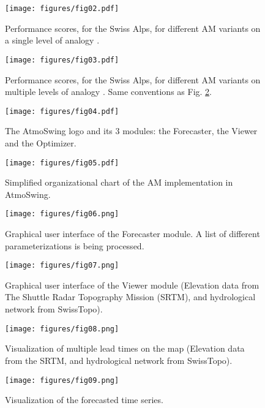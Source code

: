 \documentclass[review]{elsarticle}
\begin{document}
\begin{figure}[t]
	\texttt{[image: figures/fig02.pdf]}
	\caption{Performance scores, for the Swiss Alps, for different AM variants on a single level of analogy \citep{Horton2012a}.}
	\label{figure:scores_1}
\end{figure}

\begin{figure}[t]
	\texttt{[image: figures/fig03.pdf]}
	\caption{Performance scores, for the Swiss Alps, for different AM variants on multiple levels of analogy \citep{Horton2012a}. Same conventions as Fig. \ref{figure:scores_2}.}
	\label{figure:scores_2}
\end{figure}

\begin{figure}[t]
	\texttt{[image: figures/fig04.pdf]}
	\caption{The AtmoSwing logo and its 3 modules: the Forecaster, the Viewer and the Optimizer.}
	\label{figure:logo}
\end{figure}

\begin{figure}[t]
	\texttt{[image: figures/fig05.pdf]}
	\caption{Simplified organizational chart of the AM implementation in AtmoSwing.}
	\label{figure:flowchart_modules_atmoswing}
\end{figure}

\begin{figure}[t]
	\texttt{[image: figures/fig06.png]}
	\caption{Graphical user interface of the Forecaster module. A list of different parameterizations is being processed.}
	\label{figure:atmoswing-forecaster-gui}
\end{figure}

\begin{figure*}[t]
	\texttt{[image: figures/fig07.png]}
	\caption{Graphical user interface of the Viewer module (Elevation data from The Shuttle Radar Topography Mission (SRTM), and hydrological network from SwissTopo).}
	\label{figure:atmoswing-viewer-gui}
\end{figure*}

\begin{figure}[t]
	\texttt{[image: figures/fig08.png]}
	\caption{Visualization of multiple lead times on the map (Elevation data from the SRTM, and hydrological network from SwissTopo).}
	\label{figure:atmoswing-viewer-snail}
\end{figure}

\begin{figure}[t]
	\texttt{[image: figures/fig09.png]}
	\caption{Visualization of the forecasted time series.}
	\label{figure:atmoswing-viewer-timeseries}
\end{figure}
\end{document}
